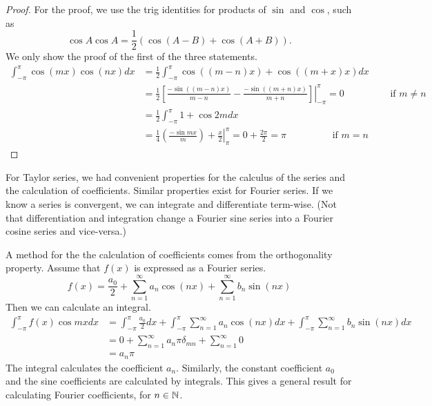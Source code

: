 \documentclass[fleqn,letterpaper]{report}
\begin{document}
\begin{proof}
For the proof, we use the trig identities for products
of $\sin$ and $\cos$, such as 
\begin{equation*}
\cos A \cos A = \frac{1}{2} \left( \cos(A-B) + \cos (A+B)
\right).
\end{equation*}
We only show the proof of the first of the three statements.
\begin{align*}
\int_{-\pi}^{\pi} \cos (mx) \cos (nx) dx & = \frac{1}{2}
\int_{-\pi}^\pi \cos ((m-n)x) + \cos((m+x)x)dx \\
& = \frac{1}{2} \left. \left[ \frac{-\sin((m-n)x)}{m-n} -
\frac{-\sin((m+n)x)}{m+n} \right] \right|_{-\pi}^{\pi} =
0 \hspace{2cm} \text{if } m \neq n \\
& = \frac{1}{2} \int_{-\pi}^\pi 1 + \cos 2m dx \\
& = \frac{1}{4} \left. \left( \frac{-\sin mx}{m} \right) +
\frac{x}{2} \right|_{\pi}^\pi = 0 + \frac{2\pi}{2} = \pi
\hspace{2cm} \text{if } m = n
\end{align*}
\end{proof}

For Taylor series, we had convenient properties for the
calculus of the series and the calculation of coefficients.
Similar properties exist for Fourier series. If we know a
series is convergent, we can integrate and differentiate
term-wise. (Not that differentiation and integration change
a Fourier sine series into a Fourier cosine series and
vice-versa.)

A method for the the calculation of coefficients comes from 
the orthogonality property. Assume that $f(x)$ is
expressed as a Fourier series.
\begin{equation*}
f(x) = \frac{a_0}{2} + \sum_{n=1}^\infty a_n \cos (nx) +
\sum_{n=1}^\infty b_n \sin (nx)
\end{equation*}
Then we can calculate an integral.
\begin{align*}
\int_{-\pi}^\pi f(x) \cos mx dx & = 
\int_{-\pi}^\pi \frac{a_0}{2} dx + \int_{-\pi}^\pi \sum_{n=1}^\infty
a_n \cos (nx) dx +
\int_{-\pi}^\pi \sum_{n=1}^\infty b_n \sin (nx) dx \\
& = 0 + \sum_{n=1}^\infty a_n \pi \delta_{mn} +
\sum_{n=1}^\infty 0 \\
& = a_n \pi 
\end{align*}
The integral calculates the coefficient $a_n$. Similarly, the
constant coefficient $a_0$ and the sine coefficients are
calculated by integrals. This gives a general result for
calculating Fourier coefficients, for $n \in \mathbb{N}$.
\end{document}
